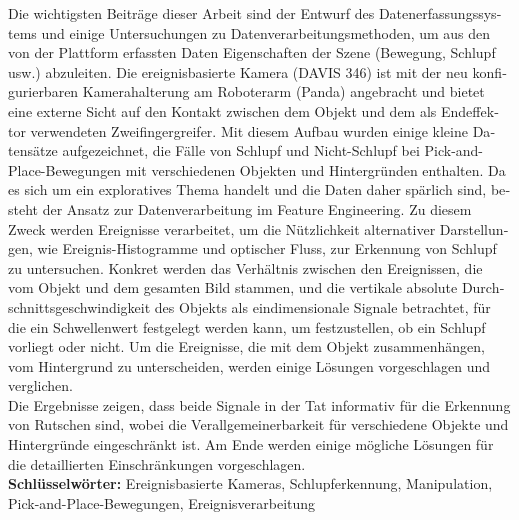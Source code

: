\begin{otherlanguage}{ngerman}
Die wichtigsten Beiträge dieser Arbeit sind der Entwurf des Datenerfassungssystems und einige Untersuchungen zu Datenverarbeitungsmethoden, um aus den von der Plattform erfassten Daten Eigenschaften der Szene (Bewegung, Schlupf usw.) abzuleiten. Die ereignisbasierte Kamera (DAVIS 346) ist mit der neu konfigurierbaren Kamerahalterung am Roboterarm (Panda) angebracht und bietet eine externe Sicht auf den Kontakt zwischen dem Objekt und dem als Endeffektor verwendeten Zweifingergreifer. Mit diesem Aufbau wurden einige kleine Datensätze aufgezeichnet, die Fälle von Schlupf und Nicht-Schlupf bei Pick-and-Place-Bewegungen mit verschiedenen Objekten und Hintergründen enthalten. Da es sich um ein exploratives Thema handelt und die Daten daher spärlich sind, besteht der Ansatz zur Datenverarbeitung im Feature Engineering. Zu diesem Zweck werden Ereignisse verarbeitet, um die Nützlichkeit alternativer Darstellungen, wie Ereignis-Histogramme und optischer Fluss, zur Erkennung von Schlupf zu untersuchen. Konkret werden das Verhältnis zwischen den Ereignissen, die vom Objekt und dem gesamten Bild stammen, und die vertikale absolute Durchschnittsgeschwindigkeit des Objekts als eindimensionale Signale betrachtet, für die ein Schwellenwert festgelegt werden kann, um festzustellen, ob ein Schlupf vorliegt oder nicht. Um die Ereignisse, die mit dem Objekt zusammenhängen, vom Hintergrund zu unterscheiden, werden einige Lösungen vorgeschlagen und verglichen.\\

Die Ergebnisse zeigen, dass beide Signale in der Tat informativ für die Erkennung von Rutschen sind, wobei die Verallgemeinerbarkeit für verschiedene Objekte und Hintergründe eingeschränkt ist. Am Ende werden einige mögliche Lösungen für die detaillierten Einschränkungen vorgeschlagen.\\

\textbf{Schlüsselwörter:} Ereignisbasierte Kameras, Schlupferkennung, Manipulation, Pick-and-Place-Bewegungen, Ereignisverarbeitung

\end{otherlanguage}


\cleardoublepage
